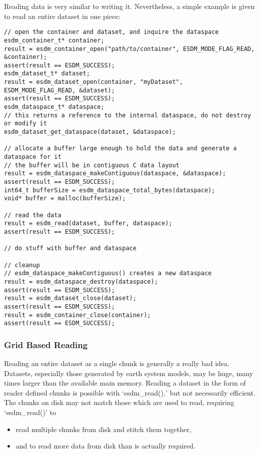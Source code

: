 Reading data is very similar to writing it. Nevertheless, a simple
example is given to read an entire dataset in one piece:

\begin{lstlisting}
// open the container and dataset, and inquire the dataspace
esdm_container_t* container;
result = esdm_container_open("path/to/container", ESDM_MODE_FLAG_READ, &container);
assert(result == ESDM_SUCCESS);
esdm_dataset_t* dataset;
result = esdm_dataset_open(container, "myDataset", ESDM_MODE_FLAG_READ, &dataset);
assert(result == ESDM_SUCCESS);
esdm_dataspace_t* dataspace;
// this returns a reference to the internal dataspace, do not destroy or modify it
esdm_dataset_get_dataspace(dataset, &dataspace);  

// allocate a buffer large enough to hold the data and generate a dataspace for it
// the buffer will be in contiguous C data layout
result = esdm_dataspace_makeContiguous(dataspace, &dataspace);  
assert(result == ESDM_SUCCESS);
int64_t bufferSize = esdm_dataspace_total_bytes(dataspace);
void* buffer = malloc(bufferSize);

// read the data
result = esdm_read(dataset, buffer, dataspace);
assert(result == ESDM_SUCCESS);

// do stuff with buffer and dataspace

// cleanup
// esdm_dataspace_makeContiguous() creates a new dataspace
result = esdm_dataspace_destroy(dataspace); 
assert(result == ESDM_SUCCESS);
result = esdm_dataset_close(dataset);
assert(result == ESDM_SUCCESS);
result = esdm_container_close(container);
assert(result == ESDM_SUCCESS);
\end{lstlisting}

\subsubsection{Grid Based Reading}

Reading an entire dataset as a single chunk is generally a really bad
idea. Datasets, especially those generated by earth system models, may
be huge, many times larger than the available main memory. Reading a
dataset in the form of reader defined chunks is possible with
`esdm\_read(),' but not necessarily efficient. The chunks on disk may
not match those which are used to read, requiring `esdm\_read()' to

\begin{itemize}
  \item read multiple chunks from disk and stitch them together,
  \item and to read more data from disk than is actually required.
\end{itemize}

